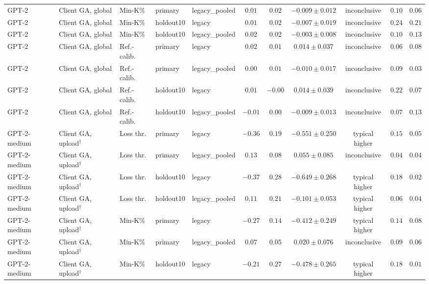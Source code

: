 \begin{table}[t]
\begin{tabular*}{\textwidth}{@{\extracolsep{\fill}}lllllcccccc@{}}
GPT-2 & Client GA, global & Min-K\% & primary & legacy\_pooled & $0.01$ & $0.02$ & $-0.009 \pm 0.012$ & inconclusive & $0.10$ & $0.06$ \\
GPT-2 & Client GA, global & Min-K\% & holdout10 & legacy & $0.01$ & $0.02$ & $-0.007 \pm 0.019$ & inconclusive & $0.24$ & $0.21$ \\
GPT-2 & Client GA, global & Min-K\% & holdout10 & legacy\_pooled & $0.02$ & $0.02$ & $-0.003 \pm 0.008$ & inconclusive & $0.10$ & $0.13$ \\
GPT-2 & Client GA, global & Ref.-calib. & primary & legacy & $0.02$ & $0.01$ & $0.014 \pm 0.037$ & inconclusive & $0.06$ & $0.08$ \\
GPT-2 & Client GA, global & Ref.-calib. & primary & legacy\_pooled & $0.00$ & $0.01$ & $-0.010 \pm 0.017$ & inconclusive & $0.09$ & $0.03$ \\
GPT-2 & Client GA, global & Ref.-calib. & holdout10 & legacy & $0.01$ & $-0.00$ & $0.014 \pm 0.039$ & inconclusive & $0.22$ & $0.07$ \\
GPT-2 & Client GA, global & Ref.-calib. & holdout10 & legacy\_pooled & $-0.01$ & $0.00$ & $-0.009 \pm 0.013$ & inconclusive & $0.07$ & $0.13$ \\
GPT-2-medium & Client GA, upload$^{\dagger}$ & Loss thr. & primary & legacy & $-0.36$ & $0.19$ & $-0.551 \pm 0.250$ & typical higher & $0.15$ & $0.05$ \\
GPT-2-medium & Client GA, upload$^{\dagger}$ & Loss thr. & primary & legacy\_pooled & $0.13$ & $0.08$ & $0.055 \pm 0.085$ & inconclusive & $0.04$ & $0.04$ \\
GPT-2-medium & Client GA, upload$^{\dagger}$ & Loss thr. & holdout10 & legacy & $-0.37$ & $0.28$ & $-0.649 \pm 0.268$ & typical higher & $0.18$ & $0.02$ \\
GPT-2-medium & Client GA, upload$^{\dagger}$ & Loss thr. & holdout10 & legacy\_pooled & $0.11$ & $0.21$ & $-0.101 \pm 0.053$ & typical higher & $0.06$ & $0.04$ \\
GPT-2-medium & Client GA, upload$^{\dagger}$ & Min-K\% & primary & legacy & $-0.27$ & $0.14$ & $-0.412 \pm 0.249$ & typical higher & $0.14$ & $0.08$ \\
GPT-2-medium & Client GA, upload$^{\dagger}$ & Min-K\% & primary & legacy\_pooled & $0.07$ & $0.05$ & $0.020 \pm 0.076$ & inconclusive & $0.09$ & $0.06$ \\
GPT-2-medium & Client GA, upload$^{\dagger}$ & Min-K\% & holdout10 & legacy & $-0.21$ & $0.27$ & $-0.478 \pm 0.265$ & typical higher & $0.18$ & $0.01$ \\

\end{tabular*}
\end{table}

